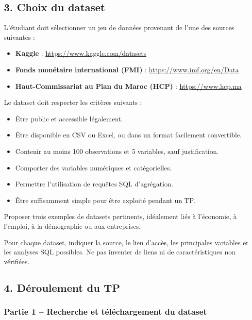 \documentclass[
]{article}
\providecommand{\tightlist}{%
  \setlength{\itemsep}{0pt}\setlength{\parskip}{0pt}}
\begin{document}
\subsection{3. Choix du dataset}\label{choix-du-dataset}

L'étudiant doit sélectionner un jeu de données provenant de l'une des
sources suivantes :

\begin{itemize}
\tightlist
\item
  \textbf{Kaggle} : \url{https://www.kaggle.com/datasets}
\item
  \textbf{Fonds monétaire international (FMI)} :
  \url{https://www.imf.org/en/Data}
\item
  \textbf{Haut-Commissariat au Plan du Maroc (HCP)} :
  \url{https://www.hcp.ma}
\end{itemize}

Le dataset doit respecter les critères suivants :

\begin{itemize}
\tightlist
\item
  Être public et accessible légalement.
\item
  Être disponible en CSV ou Excel, ou dans un format facilement
  convertible.
\item
  Contenir au moins 100 observations et 5 variables, sauf justification.
\item
  Comporter des variables numériques et catégorielles.
\item
  Permettre l'utilisation de requêtes SQL d'agrégation.
\item
  Être suffisamment simple pour être exploité pendant un TP.
\end{itemize}

Proposer trois exemples de datasets pertinents, idéalement liés à
l'économie, à l'emploi, à la démographie ou aux entreprises.

Pour chaque dataset, indiquer la source, le lien d'accès, les
principales variables et les analyses SQL possibles. Ne pas inventer de
liens ni de caractéristiques non vérifiées.

\subsection{4. Déroulement du TP}\label{duxe9roulement-du-tp}

\subsubsection{Partie 1 -- Recherche et téléchargement du
dataset}\label{partie-1-recherche-et-tuxe9luxe9chargement-du-dataset}
\end{document}
